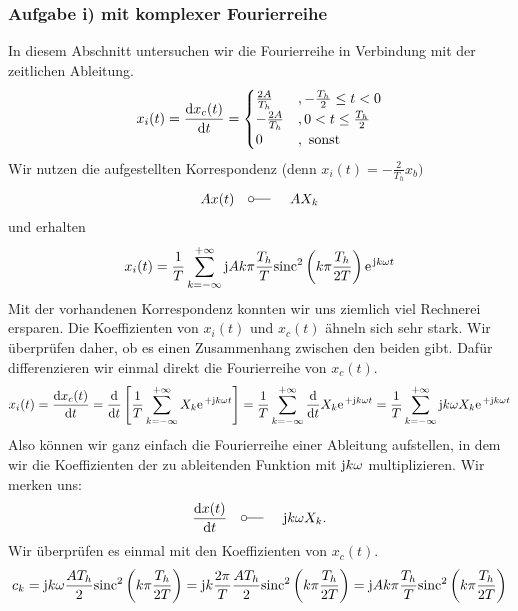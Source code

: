 \documentclass[11pt,a4paper,DIV=12]{scrartcl}
\newcommand{\sinc}{\mathrm{sinc}}
\begin{document}
\subsubsection{Aufgabe i) mit komplexer Fourierreihe}
%
%
In diesem Abschnitt untersuchen wir die Fourierreihe in Verbindung mit der
zeitlichen Ableitung.
%
%
\begin{align}
	x_{i}(t)=\frac{\mathrm{d} x_{c}(t)}{\mathrm{d} t}
	=
	\begin{cases}
		\frac{2A}{T_h}&,-\frac{T_h}{2}\leq t < 0\\
		-\frac{2A}{T_h}&,0<t\leq \frac{T_h}{2} \\
		0&,\text{ sonst}
	\end{cases}
\end{align}
%
%
Wir nutzen die aufgestellten Korrespondenz (denn $x_{i}(t)=-\frac{2}{T_h}x_{b})$
%
\begin{gather}
	Ax(t)\quad\fourier\quad AX_{k}
\end{gather}
%
und erhalten
%
\begin{align}
	x_{i}(t)=\frac{1}{T}\sum_{k=-\infty}^{+\infty}\im Ak\pi\frac{T_h}{T} \sinc^2\left(k\pi\frac{T_h}{2T}\right)\e^{\im k \omega t}
\end{align}
%
%
Mit der vorhandenen Korrespondenz konnten wir uns ziemlich viel Rechnerei
ersparen.
%
Die Koeffizienten von $x_{i}(t)$ und $x_{c}(t)$ ähneln sich sehr stark.
%
Wir überprüfen daher, ob es einen Zusammenhang zwischen den beiden gibt.
%
Dafür differenzieren wir einmal direkt die Fourierreihe von $x_{c}(t)$.
%
%
\begin{align}
	x_{i}(t)=\frac{\diff x_{c}(t)}{\diff t}
	=\frac{\diff }{\diff t}\left [\frac{1}{T}\sum_{k=-\infty}^{+\infty}X_k\e^{+\im k \omega t}\right ]
	=\frac{1}{T}\sum_{k=-\infty}^{+\infty}\frac{\diff }{\diff t}X_k\e^{+\im k \omega t}
	=\frac{1}{T}\sum_{k=-\infty}^{+\infty}\im k \omega X_k\e^{+\im k \omega t}
\end{align}
%
%
Also können wir ganz einfach die Fourierreihe einer Ableitung aufstellen,
in dem wir die Koeffizienten der zu ableitenden Funktion mit $\im k \omega$
multiplizieren.
%
Wir merken uns:
%
\begin{align}
	\frac{\diff x(t)}{\diff t}\quad\fourier\quad\im k \omega X_k.
\end{align}
%
Wir überprüfen es einmal mit den Koeffizienten von $x_c(t)$.
%
\begin{gather}
	c_k=\im k\omega \frac{AT_h}{2}\sinc^2\left(k\pi\frac{T_h}{2T}\right)
	=\im k\frac{2\pi}{T}\frac{AT_h}{2}\sinc^2\left(k\pi\frac{T_h}{2T}\right)
	=\im Ak\pi\frac{T_h}{T} \sinc^2\left(k\pi\frac{T_h}{2T}\right)
\end{gather}
\end{document}

